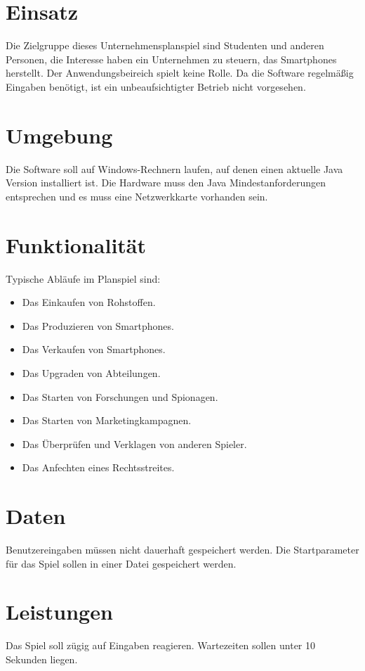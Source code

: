 \section{Einsatz}
Die Zielgruppe dieses Unternehmensplanspiel sind Studenten und anderen Personen, die Interesse haben ein Unternehmen zu steuern, das Smartphones herstellt. Der Anwendungsbeireich spielt keine Rolle. Da die Software regelmäßig Eingaben benötigt, ist ein unbeaufsichtigter Betrieb nicht vorgesehen.

\section{Umgebung}
Die Software soll auf Windows-Rechnern laufen, auf denen einen aktuelle Java Version installiert ist. Die Hardware muss den Java Mindestanforderungen entsprechen und es muss eine Netzwerkkarte vorhanden sein.

\section{Funktionalität}
Typische Abläufe im Planspiel sind:
\begin{itemize}
\item Das Einkaufen von Rohstoffen.
\item Das Produzieren von Smartphones.
\item Das Verkaufen von Smartphones.
\item Das Upgraden von Abteilungen.
\item Das Starten von Forschungen und Spionagen.
\item Das Starten von Marketingkampagnen.
\item Das Überprüfen und Verklagen von anderen Spieler. 
\item Das Anfechten eines Rechtsstreites.
\end{itemize}

\section{Daten}
Benutzereingaben müssen nicht dauerhaft gespeichert werden. Die Startparameter für das Spiel sollen in einer Datei gespeichert werden.

\section{Leistungen}
Das Spiel soll zügig auf Eingaben reagieren. Wartezeiten sollen unter 10 Sekunden liegen.

